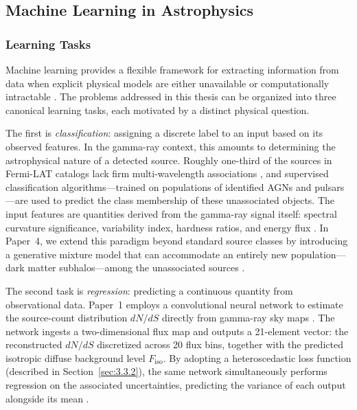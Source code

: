 \subsection{Machine Learning in Astrophysics}
\label{sec:3.3}

\subsubsection{Learning Tasks}
\label{sec:3.3.1}

Machine learning provides a flexible framework for extracting information from data when explicit physical models are either unavailable or computationally intractable \cite{Bishop:2006, Hastie:2009}. The problems addressed in this thesis can be organized into three canonical learning tasks, each motivated by a distinct physical question.

The first is \textit{classification}: assigning a discrete label to an input based on its observed features. In the gamma-ray context, this amounts to determining the astrophysical nature of a detected source. Roughly one-third of the sources in Fermi-LAT catalogs lack firm multi-wavelength associations \cite{Bhat:2022}, and supervised classification algorithms---trained on populations of identified AGNs and pulsars---are used to predict the class membership of these unassociated objects. The input features are quantities derived from the gamma-ray signal itself: spectral curvature significance, variability index, hardness ratios, and energy flux \cite{Bhat:2022}. In Paper~4, we extend this paradigm beyond standard source classes by introducing a generative mixture model that can accommodate an entirely new population---dark matter subhalos---among the unassociated sources \cite{Amerio:2025sub}.

The second task is \textit{regression}: predicting a continuous quantity from observational data. Paper~1 employs a convolutional neural network to estimate the source-count distribution $dN/dS$ directly from gamma-ray sky maps \cite{Amerio:2023dns}. The network ingests a two-dimensional flux map and outputs a 21-element vector: the reconstructed $dN/dS$ discretized across 20 flux bins, together with the predicted isotropic diffuse background level $F_\mathrm{iso}$. By adopting a heteroscedastic loss function (described in Section~\ref{sec:3.3.2}), the same network simultaneously performs regression on the associated uncertainties, predicting the variance of each output alongside its mean \cite{Kendall:2017}.

